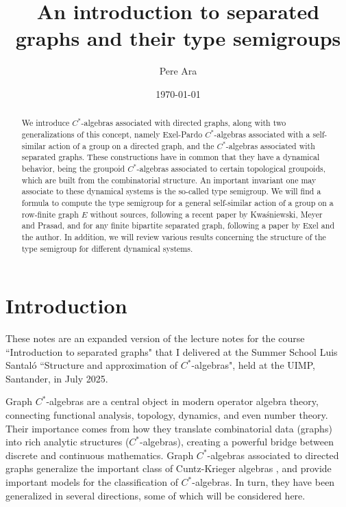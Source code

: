 \documentclass[11pt]{amsart}
\title[Graph $C^*$-algebras]{An introduction to separated graphs and their type semigroups}
\author{Pere Ara}
\date{\today}
\theoremstyle{plain}            %
\theoremstyle{definition}       %
\theoremstyle{definition}       %
\theoremstyle{remark}
\begin{document}
\maketitle

\begin{abstract}
We introduce $C^*$-algebras associated with directed graphs, along with two generalizations of this concept, namely Exel-Pardo $C^*$-algebras associated with a self-similar action of a group on a directed graph, and the $C^*$-algebras associated with separated graphs. These constructions have in common that they have a dynamical behavior, being the groupoid $C^*$-algebras associated to certain topological groupoids, which are built from the combinatorial structure. An important invariant one may associate to these dynamical systems is the so-called type semigroup. We will find a formula to compute the type semigroup for a general self-similar action of a group on a row-finite graph $E$ without sources, following a recent paper by Kwaśniewski, Meyer and Prasad, and for any finite bipartite separated graph, following a paper by Exel and the author. In addition, we will review various results concerning the structure of the type semigroup for different dynamical systems.  
\end{abstract}
\tableofcontents




\section{Introduction}

\vskip1cm

These notes are an expanded version of the lecture notes for the course ``Introduction to separated graphs" that I delivered at the Summer School Luis Santaló ``Structure and approximation of $C^*$-algebras", held at the UIMP, Santander, in July 2025.  

Graph $C^*$-algebras are a central object in modern operator algebra theory, connecting functional analysis, topology, dynamics, and even number theory. Their importance comes from how they translate combinatorial data (graphs) into rich analytic structures ($C^*$-algebras), creating a powerful bridge between discrete and continuous mathematics. Graph $C^*$-algebras associated to directed graphs generalize the important class of Cuntz-Krieger algebras \cite{CK}, and provide important models for the classification of $C^*$-algebras. In turn, they have been generalized in several directions, some of which will be considered here.
 
\end{document}
